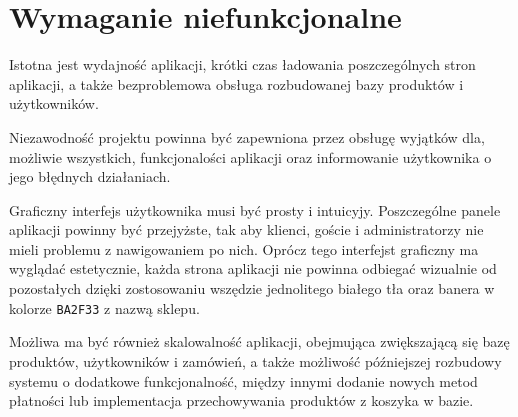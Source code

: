 
\section{Wymaganie niefunkcjonalne}
\label{sec:wymagania niefunkcjonalne}

Istotna jest wydajność aplikacji, krótki czas ładowania poszczególnych stron aplikacji, a także bezproblemowa obsługa
rozbudowanej bazy produktów i użytkowników.

Niezawodność projektu powinna być zapewniona przez obsługę wyjątków dla, możliwie wszystkich, funkcjonalości aplikacji oraz 
informowanie użytkownika o jego błędnych działaniach.

Graficzny interfejs użytkownika musi być prosty i intuicyjy. Poszczególne panele aplikacji powinny być przejyżste, tak aby
klienci, goście i administratorzy nie mieli problemu z nawigowaniem po nich. Oprócz tego interfejst graficzny ma wyglądać estetycznie, każda strona 
aplikacji nie powinna odbiegać wizualnie od pozostałych dzięki zostosowaniu wszędzie jednolitego białego tła oraz banera w kolorze \texttt{BA2F33} z nazwą sklepu.

Możliwa ma być również skalowalność aplikacji, obejmująca zwiększającą się bazę produktów, użytkowników i zamówień, a także możliwość późniejszej
rozbudowy systemu o dodatkowe funkcjonalność, między innymi dodanie nowych metod płatności lub implementacja przechowywania produktów z koszyka w bazie.